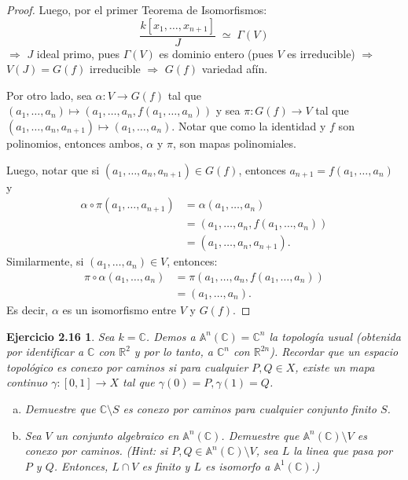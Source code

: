 \documentclass[12pt,a4paper]{article}
\theoremstyle{plain}
\newtheorem*{ejercicio3}{Ejercicio 2.16}
\newcommand{\C}{\mathbb{C}}
\newcommand{\R}{\mathbb{R}}
\begin{document}
\begin{proof}
	Luego, por el primer Teorema de Isomorfismos:
	\[
	  \frac{k[x_1,\ldots,x_{n+1}]}{J}\;\simeq\;\Gamma(V)
	\]
	$\Rightarrow$ $J$ ideal primo, pues $\Gamma(V)$ es dominio entero (pues $V$ es irreducible)
	$\Rightarrow$ $V(J)=G(f)$ irreducible
	$\Rightarrow$ $G(f)$ variedad afín.

	Por otro lado, sea $\alpha:V\to G(f)$ tal que $(a_1,\ldots,a_n)\mapsto(a_1,\ldots,a_n,f(a_1,\ldots,a_n))$ y sea $\pi:G(f)\to V$ tal que $(a_1,\ldots,a_n,a_{n+1})\mapsto(a_1,\ldots,a_n)$. Notar que como la identidad y $f$ son polinomios, entonces ambos, $\alpha$ y $\pi$, son mapas polinomiales.

	Luego, notar que si $(a_1,\ldots,a_n,a_{n+1})\in G(f)$, entonces $a_{n+1}=f(a_1,\ldots,a_n)$ y
	\begin{align*}
	  \alpha\circ\pi(a_1,\ldots,a_{n+1}) &= \alpha(a_1,\ldots,a_n)\\
	  &=(a_1,\ldots,a_n,f(a_1,\ldots,a_n))\\
	  &=(a_1,\ldots,a_n,a_{n+1}).
	\end{align*}
	Similarmente, si $(a_1,\ldots,a_n)\in V$, entonces:
	\begin{align*}
	  \pi\circ\alpha(a_1,\ldots,a_n) &= \pi(a_1,\ldots,a_n,f(a_1,\ldots,a_n))\\
	  &=(a_1,\ldots,a_n).
	\end{align*}
	Es decir, $\alpha$ es un isomorfismo entre $V$ y $G(f)$.
\end{proof}

\begin{ejercicio3}
	Sea $k = \C$. Demos a $\mathbb{A}^{n}(\C) = \C^{n}$ la topología usual (obtenida por identificar a $\C$ con $\R^{2}$ y por lo tanto, a $\C^{n}$ con $\R^{2n}$). Recordar que un espacio topológico es \textit{conexo por caminos} si para cualquier $P,Q \in X$, existe un mapa continuo $\gamma \colon [0,1] \to X$ tal que $\gamma(0) = P, \gamma(1) = Q$.
	\begin{enumerate}[(a)]
		\item Demuestre que $\C \setminus S$ es conexo por caminos para cualquier conjunto finito $S$.

		\item Sea $V$ un conjunto algebraico en $\mathbb{A}^{n}(\C)$. Demuestre que $\mathbb{A}^{n}(\C) \setminus V$ es conexo por caminos. (Hint: si $P,Q \in \mathbb{A}^{n}(\C) \setminus V$, sea $L$ la linea que pasa por $P$ y $Q$. Entonces, $L \cap V$ es finito y $L$ es isomorfo a $\mathbb{A}^{1}(\C)$.)
	\end{enumerate}
\end{ejercicio3}
\end{document}
